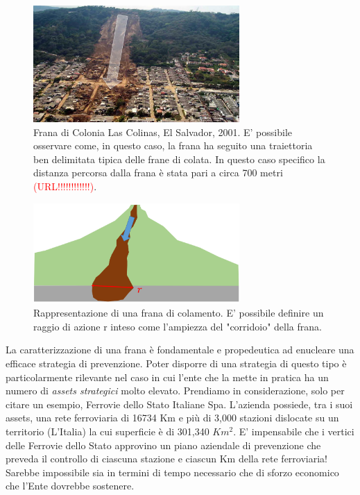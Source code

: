 \begin{figure}[h]
	\centering
	\includegraphics[width=0.7\textwidth]{images/traiettoria_frana}
	\caption{Frana di Colonia Las Colinas, El Salvador, 2001. E' possibile osservare come, in questo caso, la frana ha seguito una traiettoria ben delimitata tipica delle frane di colata. In questo caso specifico la distanza percorsa dalla frana è stata pari a circa 700 metri \textcolor{red} {(URL!!!!!!!!!!!!)}.}
	\label{traiettoriaFrana}
\end{figure}


\begin{figure}[h]
	\centering
	\includegraphics[width=0.7\textwidth]{images/traiettoria_frana2}
	\caption{Rappresentazione di una frana di colamento. E' possibile definire un raggio di azione r inteso come l'ampiezza del "corridoio" della frana.}
	\label{traiettoriaFrana2}
\end{figure}

La caratterizzazione di una frana è fondamentale e propedeutica ad enucleare una efficace strategia di prevenzione. Poter disporre di una strategia di questo tipo è particolarmente rilevante nel caso in cui l'ente che la mette in pratica ha un numero di \textit{assets strategici} molto elevato. Prendiamo in considerazione, solo per citare un esempio, Ferrovie dello Stato Italiane Spa. L'azienda possiede, tra i suoi assets, una rete ferroviaria di 16734 Km e più di 3,000 stazioni dislocate su un territorio (L'Italia) la cui superficie è di 301,340 $Km^2$. E' impensabile che i vertici delle Ferrovie dello Stato approvino un piano aziendale di prevenzione che preveda il controllo di ciascuna stazione e ciascun Km della rete ferroviaria! Sarebbe impossibile sia in termini di tempo necessario che di sforzo economico che l'Ente dovrebbe sostenere. 

